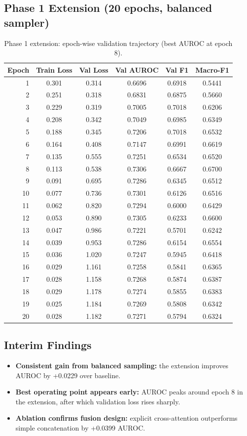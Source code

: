 \documentclass[11pt]{article}
\begin{document}
\subsection{Phase 1 Extension (20 epochs, balanced sampler)}
\begin{table}[t]
\centering
\small
\caption{Phase 1 extension: epoch-wise validation trajectory (best AUROC at epoch 8).}
\begin{tabular}{rccccc}
\toprule
Epoch & Train Loss & Val Loss & Val AUROC & Val F1 & Macro-F1 \\
\midrule
1 & 0.301 & 0.314 & 0.6696 & 0.6918 & 0.5441 \\
2 & 0.251 & 0.318 & 0.6831 & 0.6875 & 0.5660 \\
3 & 0.229 & 0.319 & 0.7005 & 0.7018 & 0.6206 \\
4 & 0.208 & 0.342 & 0.7049 & 0.6985 & 0.6349 \\
5 & 0.188 & 0.345 & 0.7206 & 0.7018 & 0.6532 \\
6 & 0.164 & 0.408 & 0.7147 & 0.6991 & 0.6619 \\
7 & 0.135 & 0.555 & 0.7251 & 0.6534 & 0.6520 \\
8 & 0.113 & 0.538 & 0.7306 & 0.6667 & 0.6700 \\
9 & 0.091 & 0.695 & 0.7286 & 0.6345 & 0.6512 \\
10 & 0.077 & 0.736 & 0.7301 & 0.6126 & 0.6516 \\
11 & 0.062 & 0.820 & 0.7294 & 0.6000 & 0.6429 \\
12 & 0.053 & 0.890 & 0.7305 & 0.6233 & 0.6600 \\
13 & 0.047 & 0.986 & 0.7221 & 0.5701 & 0.6242 \\
14 & 0.039 & 0.953 & 0.7286 & 0.6154 & 0.6554 \\
15 & 0.036 & 1.020 & 0.7247 & 0.5945 & 0.6418 \\
16 & 0.029 & 1.161 & 0.7258 & 0.5841 & 0.6365 \\
17 & 0.028 & 1.158 & 0.7268 & 0.5874 & 0.6387 \\
18 & 0.029 & 1.178 & 0.7274 & 0.5855 & 0.6383 \\
19 & 0.025 & 1.184 & 0.7269 & 0.5808 & 0.6342 \\
20 & 0.028 & 1.182 & 0.7271 & 0.5794 & 0.6324 \\
\bottomrule
\end{tabular}
\label{tab:phase1extepochs}
\end{table}

\subsection{Interim Findings}
\begin{itemize}[leftmargin=*]
  \item \textbf{Consistent gain from balanced sampling:} the extension improves AUROC by +0.0229 over baseline.
  \item \textbf{Best operating point appears early:} AUROC peaks around epoch 8 in the extension, after which validation loss rises sharply.
  \item \textbf{Ablation confirms fusion design:} explicit cross-attention outperforms simple concatenation by +0.0399 AUROC.
\end{itemize}
\end{document}

